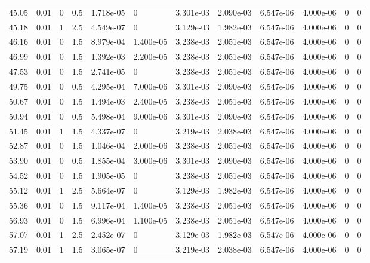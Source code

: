\documentclass[preview]{standalone}
\begin{document}
{{{\begin{tabular}{L{1.2cm}C{1.2cm} C{0.3cm}C{0.5cm} C{1.4cm}C{1.4cm} C{1.4cm}C{1.4cm} C{1.6cm}C{1.6cm} C{1.6cm}C{1.6cm}}
  45.05  &  0.01  & 0     & 0.5 &  1.718e-05  & 0  &  3.301e-03&   2.090e-03& 6.547e-06 & 4.000e-06   &  0 & 0  \\ 
  45.18  &  0.01  & 1     & 2.5 &  4.549e-07  & 0  &  3.129e-03&   1.982e-03& 6.547e-06 & 4.000e-06   &  0 & 0  \\ 
  46.16  &  0.01  & 0     & 1.5 &  8.979e-04  & 1.400e-05  &  3.238e-03&   2.051e-03& 6.547e-06 & 4.000e-06   &  0 & 0  \\ 
  46.99  &  0.01  & 0     & 1.5 &  1.392e-03  & 2.200e-05  &  3.238e-03&   2.051e-03& 6.547e-06 & 4.000e-06   &  0 & 0  \\ 
  47.53  &  0.01  & 0     & 1.5 &  2.741e-05  & 0  &  3.238e-03&   2.051e-03& 6.547e-06 & 4.000e-06   &  0 & 0  \\ 
  49.75  &  0.01  & 0     & 0.5 &  4.295e-04  & 7.000e-06  &  3.301e-03&   2.090e-03& 6.547e-06 & 4.000e-06   &  0 & 0  \\ 
  50.67  &  0.01  & 0     & 1.5 &  1.494e-03  & 2.400e-05  &  3.238e-03&   2.051e-03& 6.547e-06 & 4.000e-06   &  0 & 0  \\ 
  50.94  &  0.01  & 0     & 0.5 &  5.498e-04  & 9.000e-06  &  3.301e-03&   2.090e-03& 6.547e-06 & 4.000e-06   &  0 & 0  \\ 
  51.45  &  0.01  & 1     & 1.5 &  4.337e-07  & 0  &  3.219e-03&   2.038e-03& 6.547e-06 & 4.000e-06   &  0 & 0  \\ 
  52.87  &  0.01  & 0     & 1.5 &  1.046e-04  & 2.000e-06  &  3.238e-03&   2.051e-03& 6.547e-06 & 4.000e-06   &  0 & 0  \\ 
  53.90  &  0.01  & 0     & 0.5 &  1.855e-04  & 3.000e-06  &  3.301e-03&   2.090e-03& 6.547e-06 & 4.000e-06   &  0 & 0  \\ 
  54.52  &  0.01  & 0     & 1.5 &  1.905e-05  & 0  &  3.238e-03&   2.051e-03& 6.547e-06 & 4.000e-06   &  0 & 0  \\ 
  55.12  &  0.01  & 1     & 2.5 &  5.664e-07  & 0  &  3.129e-03&   1.982e-03& 6.547e-06 & 4.000e-06   &  0 & 0  \\ 
  55.36  &  0.01  & 0     & 1.5 &  9.117e-04  & 1.400e-05  &  3.238e-03&   2.051e-03& 6.547e-06 & 4.000e-06   &  0 & 0  \\ 
  56.93  &  0.01  & 0     & 1.5 &  6.996e-04  & 1.100e-05  &  3.238e-03&   2.051e-03& 6.547e-06 & 4.000e-06   &  0 & 0  \\ 
  57.07  &  0.01  & 1     & 2.5 &  2.452e-07  & 0  &  3.129e-03&   1.982e-03& 6.547e-06 & 4.000e-06   &  0 & 0  \\ 
  57.19  &  0.01  & 1     & 1.5 &  3.065e-07  & 0  &  3.219e-03&   2.038e-03& 6.547e-06 & 4.000e-06   &  0 & 0  \\ 

\end{tabular}}}}
\end{document}
